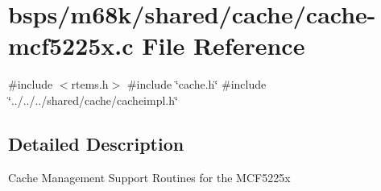 \hypertarget{cache-mcf5225x_8c}{}\section{bsps/m68k/shared/cache/cache-\/mcf5225x.c File Reference}
\label{cache-mcf5225x_8c}
{\ttfamily \#include $<$rtems.\+h$>$}\newline
{\ttfamily \#include \char`\"{}cache.\+h\char`\"{}}\newline
{\ttfamily \#include \char`\"{}../../../shared/cache/cacheimpl.\+h\char`\"{}}\newline


\subsection{Detailed Description}
Cache Management Support Routines for the M\+C\+F5225x 